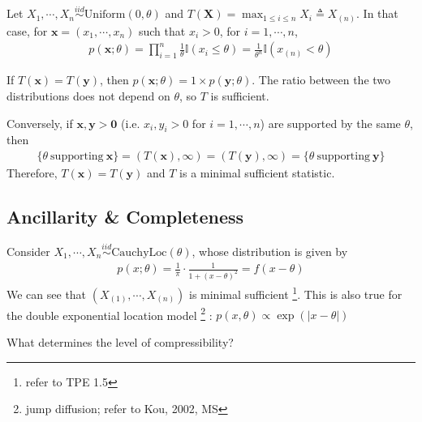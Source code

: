 \begin{example}
    Let $X_1,\cdots,X_n\overset{iid}{\sim}\text{Uniform}(0,\theta)$ 
    and $T(\boldsymbol{X})=\max_{1\leq i\leq n} X_i \triangleq X_{(n)}$.
    In that case, for $\boldsymbol{x}=(x_1,\cdots,x_n)$ such that $x_i>0$,
    for $i=1,\cdots,n$,
    \begin{gather}
        p(\boldsymbol{x};\theta)
        =\prod_{i=1}^n \frac{1}{\theta}\mathbb{I}(x_i\leq \theta)
        =\frac{1}{\theta^n}\mathbb{I}\left(
        x_{(n)} < \theta
        \right)
    \end{gather}

    If $T(\boldsymbol{x})=T(\boldsymbol{y})$,
    then $p(\boldsymbol{x};\theta)=1\times p(\boldsymbol{y};\theta)$.
    The ratio between the two distributions does not depend on $\theta$,
    so $T$ is sufficient.
    
    Conversely, if $\boldsymbol{x},\boldsymbol{y}>\boldsymbol{0}$ 
    (i.e. $x_i,y_i>0$ for $i=1,\cdots,n$) are supported by the same $\theta$, then
    \begin{gather}
        \{\theta~\text{supporting}~\boldsymbol{x}\}=(T(\boldsymbol{x}),\infty)
        =(T(\boldsymbol{y}),\infty)=\{\theta~\text{supporting}~\boldsymbol{y}\}
    \end{gather}
    Therefore, $T(\boldsymbol{x})=T(\boldsymbol{y})$ and $T$ is a minimal sufficient statistic.
\end{example}

\subsection{Ancillarity \& Completeness}

\begin{example}
    Consider $X_1,\cdots,X_n\overset{iid}{\sim}\text{CauchyLoc}(\theta)$,
    whose distribution is given by 
    \begin{gather}
        p(x;\theta)=\frac{1}{\pi}\cdot\frac{1}{1+(x-\theta)^2}=f(x-\theta)
    \end{gather}
    We can see that $(X_{(1)},\cdots,X_{(n)})$ is minimal sufficient
    \footnote{refer to TPE 1.5}. 
    This is also true for the double exponential location model
    \footnote{jump diffusion;
    refer to Kou, 2002, MS}
    : $p(x,\theta)\propto\exp{(|x-\theta|)}$
\end{example}

\begin{question}
    What determines the level of compressibility?
\end{question}

